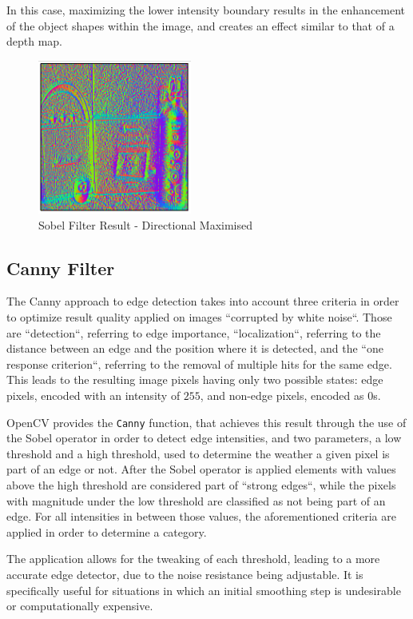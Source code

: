 In this case, maximizing the lower intensity boundary results in the enhancement of the object shapes within
the image, and creates an effect similar to that of a depth map.

\begin{figure}[H]
	\includegraphics[width=0.45\textwidth, height=0.45\textwidth]{resources/Sobel_4.png}
	\caption{Sobel Filter Result - Directional Maximised}
\end{figure}

\subsection{Canny Filter}

The Canny approach to edge detection takes into account three criteria in order to optimize result quality
applied on images ``corrupted by white noise``. Those are ``detection``, referring to edge importance,
``localization``, referring to the distance between an edge and the position where it is detected, and the
``one response criterion``, referring to the removal of multiple hits for the same edge. This leads to the
resulting image pixels having only two possible states: edge pixels, encoded with an intensity of \(255\), and
non-edge pixels, encoded as 0s.

OpenCV provides the \verb|Canny| function, that achieves this result through the use of the Sobel operator
in order to detect edge intensities, and two parameters, a low threshold and a high threshold, used to
determine the weather a given pixel is part of an edge or not. After the Sobel operator is applied
elements with values above the high threshold are considered part of ``strong edges``, while the pixels with
magnitude under the low threshold are classified as not being part of an edge. For all intensities in between
those values, the aforementioned criteria are applied in order to determine a category.

The application allows for the tweaking of each threshold, leading to a more accurate edge detector, due to
the noise resistance being adjustable. It is specifically useful for situations in which an initial smoothing
step is undesirable or computationally expensive.

